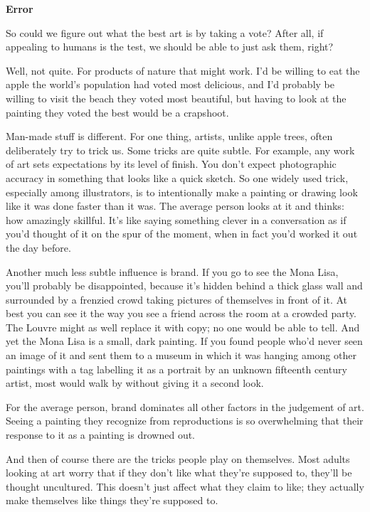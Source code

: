 \documentclass[12pt]{book}
\begin{document}
\textbf{Error}

So could we figure out what the best art is by taking a vote? After all,
if appealing to humans is the test, we should be able to just ask them,
right?

Well, not quite. For products of nature that might work. I'd be willing
to eat the apple the world's population had voted most delicious, and
I'd probably be willing to visit the beach they voted most beautiful,
but having to look at the painting they voted the best would be a
crapshoot.

Man-made stuff is different. For one thing, artists, unlike apple trees,
often deliberately try to trick us. Some tricks are quite subtle. For
example, any work of art sets expectations by its level of finish. You
don't expect photographic accuracy in something that looks like a quick
sketch. So one widely used trick, especially among illustrators, is to
intentionally make a painting or drawing look like it was done faster
than it was. The average person looks at it and thinks: how amazingly
skillful. It's like saying something clever in a conversation as if
you'd thought of it on the spur of the moment, when in fact you'd worked
it out the day before.

Another much less subtle influence is brand. If you go to see the Mona
Lisa, you'll probably be disappointed, because it's hidden behind a
thick glass wall and surrounded by a frenzied crowd taking pictures of
themselves in front of it. At best you can see it the way you see a
friend across the room at a crowded party. The Louvre might as well
replace it with copy; no one would be able to tell. And yet the Mona
Lisa is a small, dark painting. If you found people who'd never seen an
image of it and sent them to a museum in which it was hanging among
other paintings with a tag labelling it as a portrait by an unknown
fifteenth century artist, most would walk by without giving it a second
look.

For the average person, brand dominates all other factors in the
judgement of art. Seeing a painting they recognize from reproductions is
so overwhelming that their response to it as a painting is drowned out.

And then of course there are the tricks people play on themselves. Most
adults looking at art worry that if they don't like what they're
supposed to, they'll be thought uncultured. This doesn't just affect
what they claim to like; they actually make themselves like things
they're supposed to.
\end{document}
